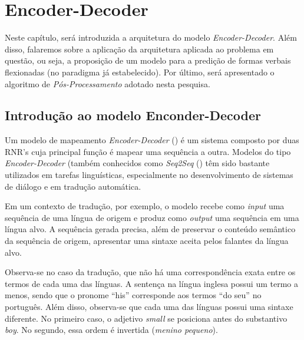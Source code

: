 \chapter{Encoder-Decoder}
\label{ch:05}

Neste capítulo, será introduzida a arquitetura do modelo \textit{Encoder-Decoder}. Além disso, falaremos sobre a aplicação da arquitetura aplicada ao problema em questão, ou seja, a proposição de um modelo para a predição de formas verbais flexionadas (no paradigma já estabelecido). Por último, será apresentado o algoritmo de \textit{Pós-Processamento} adotado nesta pesquisa.

\section{Introdução ao modelo Enconder-Decoder}
\label{sec:intro-sec-sec}
Um modelo de mapeamento \textit{Encoder-Decoder} (\cite{enc-dec:2014}) é um sistema composto por duas RNR's cuja principal função é mapear uma sequência a outra. Modelos do tipo \textit{Encoder-Decoder} (também conhecidos como \textit{Seq2Seq} (\cite{seq2seq:2014}) têm sido bastante utilizados em tarefas linguísticas, especialmente no desenvolvimento de sistemas de diálogo e em tradução automática.

Em um contexto de tradução, por exemplo, o modelo recebe como \textit{input }uma sequência de uma língua de origem e produz como \textit{output} uma sequência em uma língua alvo. A sequência gerada precisa, além de preservar o conteúdo semântico da sequência de origem, apresentar uma sintaxe aceita pelos falantes da língua alvo. 


Observa-se no caso da tradução, que não há uma correspondência exata entre os termos de cada uma das línguas. A sentença na língua inglesa possui um termo a menos, sendo que o pronome “his” corresponde aos termos “do seu” no português. Além disso, observa-se que cada uma das línguas possui uma sintaxe diferente. No primeiro caso, o adjetivo \textit{small} se posiciona antes do substantivo \textit{boy}. No segundo, essa ordem é invertida (\textit{menino pequeno}). 

